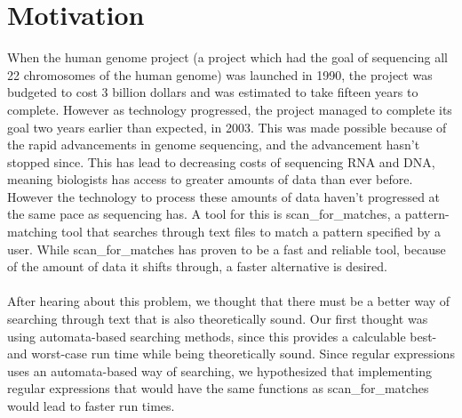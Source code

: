 \section{Motivation}
When the human genome project (a project which had the goal of sequencing 
all 22 chromosomes of the human genome) was launched in 1990, the project was 
budgeted to cost 3 billion dollars and was estimated to take fifteen years 
to complete. However as technology progressed, the project managed to complete 
its goal two years earlier than expected, in 2003. This was made possible 
because of the rapid advancements in genome sequencing, and the advancement 
hasn't stopped since. This has lead to decreasing costs of sequencing RNA and DNA, 
meaning biologists has access to greater amounts of data than ever before. 
However the technology to process these amounts of data haven't progressed at 
the same pace as sequencing has. A tool for this is scan\_for\_matches, a 
pattern-matching tool that searches through text files to match a pattern specified 
by a user. While scan\_for\_matches has proven to be a fast and reliable 
tool, because of the amount of data it shifts through, a faster alternative 
is desired.\\\\
After hearing about this problem, we thought that there must be a better 
way of searching through text that is also theoretically sound. Our first 
thought was using automata-based searching methods, since this provides a 
calculable best- and worst-case run time while being theoretically sound. 
Since regular expressions uses an automata-based way of searching, we hypothesized 
that implementing regular expressions that would have the same functions as 
scan\_for\_matches would lead to faster run times.
